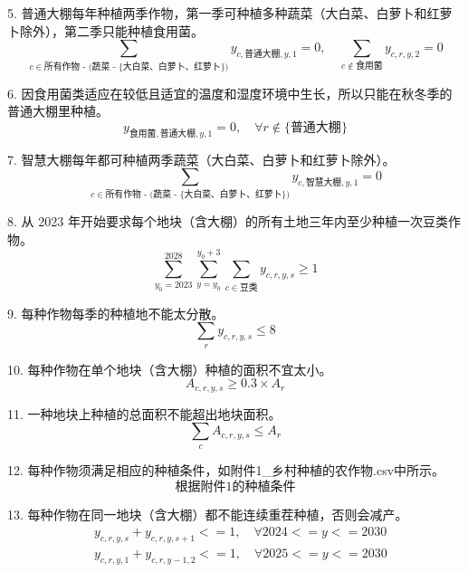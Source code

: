 \documentclass{cumcmthesis}
\begin{document}
5. 普通大棚每年种植两季作物，第一季可种植多种蔬菜（大白菜、白萝卜和红萝卜除外），第二季只能种植食用菌。
   \begin{equation}
    \sum_{c \in \text{所有作物 - (蔬菜 - \{大白菜、白萝卜、红萝卜\})}} y_{c,\text{普通大棚},y,1} = 0, \quad \sum_{c \notin \text{食用菌}} y_{c,r,y,2} = 0
   \end{equation}

6. 因食用菌类适应在较低且适宜的温度和湿度环境中生长，所以只能在秋冬季的普通大棚里种植。
   \begin{equation}
    y_{\text{食用菌},\text{普通大棚},y,1} = 0, \quad \forall r \notin \{\text{普通大棚}\}
   \end{equation}

7. 智慧大棚每年都可种植两季蔬菜（大白菜、白萝卜和红萝卜除外）。
   \begin{equation}
    \sum_{c \in \text{所有作物 - (蔬菜 - \{大白菜、白萝卜、红萝卜\})}} y_{c,\text{智慧大棚},y,1} = 0
   \end{equation}

8. 从 2023 年开始要求每个地块（含大棚）的所有土地三年内至少种植一次豆类作物。
   \begin{equation}
   \sum_{y_0=2023}^{2028}  \sum_{y = y_0}^{y_0 + 3} \sum_{c \in \text{豆类}} y_{c,r,y,s} \geq 1
   \end{equation}

9. 每种作物每季的种植地不能太分散。
   \begin{equation}
   \sum_{r} y_{c,r,y,s} \leq 8
   \end{equation}

10. 每种作物在单个地块（含大棚）种植的面积不宜太小。
    \begin{equation}
    A_{c,r,y,s} \geq 0.3 \times A_r
    \end{equation}

11. 一种地块上种植的总面积不能超出地块面积。
    \begin{equation}
    \sum_{c} A_{c,r,y,s} \leq A_r
    \end{equation}

12. 每种作物须满足相应的种植条件，如附件1\_乡村种植的农作物.csv中所示。
    \begin{equation}
    \text{根据附件1的种植条件}
    \end{equation}

13. 每种作物在同一地块（含大棚）都不能连续重茬种植，否则会减产。
    \begin{align}
    &y_{c,r,y,s} + y_{c,r,y,s+1} <= 1, \quad \forall 2024 <= y <= 2030 \quad  \\ \quad &y_{c,r,y,1} + y_{c,r,y-1,2} <= 1, \quad \forall 2025 <= y <= 2030
    \end{align}
\end{document}
